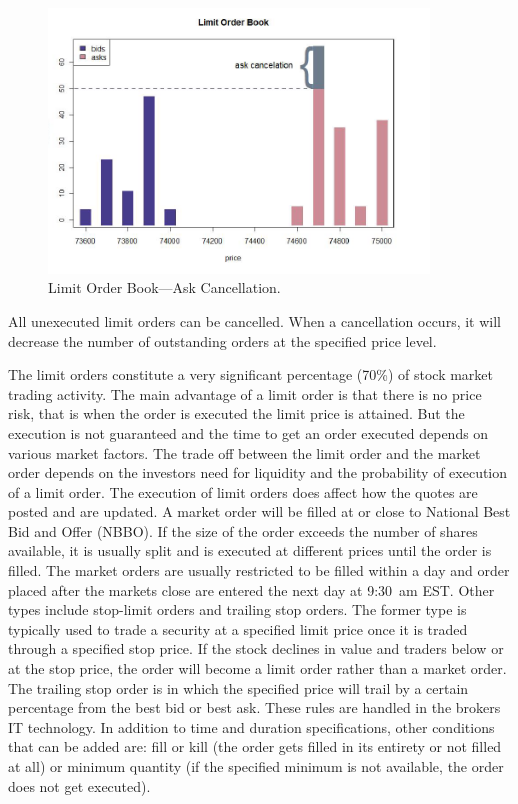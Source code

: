	\begin{figure}[!ht]
	   \centering
	   \includegraphics[width=0.9\textwidth]{chapters/chapter_el_exch/figures/limitbk3.png} 
	   \caption{Limit Order Book---Ask Cancellation. \label{fig:limbk3}}
	\end{figure}
All unexecuted limit orders can be cancelled. When a cancellation occurs, it will decrease the number of outstanding orders at the specified price level. 


The limit orders constitute a very significant percentage (70\%) of stock market trading activity. The main advantage of a limit order is that there is no price risk, that is when the order is executed the limit price is attained. But the execution is not guaranteed and the time to get an order executed depends on various market factors. The trade off between the limit order and the market order depends on the investors need for liquidity and the probability of execution of a limit order. The execution of limit orders does affect how the quotes are posted and are updated. A market order will be filled at or close to National Best Bid and Offer (NBBO). If the size of the order exceeds the number of shares available, it is usually split and is executed at different prices until the order is filled. The market orders are usually restricted to be filled within a day and order placed after the markets close are entered the next day at 9:30~am EST. Other types include stop-limit orders and trailing stop orders. The former type is typically used to trade a security at a specified limit price once it is traded through a specified stop price. If the stock declines in value and traders below or at the stop price, the order will become a limit order rather than a market order. The trailing stop order is in which the specified price will trail by a certain percentage from the best bid or best ask. These rules are handled in the brokers IT technology. In addition to time and duration specifications, other conditions that can be added are: fill or kill (the order gets filled in its entirety or not filled at all) or minimum quantity (if the specified minimum is not available, the order does not get executed).  

